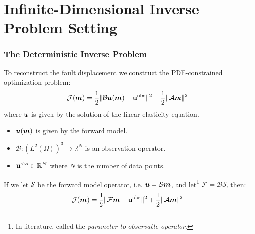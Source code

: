 \documentclass[
    pdf,
    10pt,
    xcolor={svgnames},
  ]{beamer}
\newcommand{\mc}[1]{\mathcal{#1}}
\newcommand{\R}{\mathbb{R}}
\renewcommand{\vec}[1]{{\mathchoice
                     {\mbox{\boldmath$\displaystyle{#1}$}}
                     {\mbox{\boldmath$\textstyle{#1}$}}
                     {\mbox{\boldmath$\scriptstyle{#1}$}}
                     {\mbox{\boldmath$\scriptscriptstyle{#1}$}}}}
\newcommand{\obs}{\mathbf{u}^{\rm obs}}
\begin{document}
\section{Infinite-Dimensional Inverse Problem Setting}
\begin{frame}
  \frametitle{The Deterministic Inverse Problem}
  To reconstruct the fault displacement we construct the PDE-constrained
  optimization problem:
  \[
    \mc{J}(\vec{m})
    = \frac{1}{2} \| \mc{B}\vec{u}(\vec{m}) - \obs \|^2
    + \frac{1}{2} \| \mc{A}\vec{m} \|^2
  \]
  where $\vec{u}$ is given by the solution of the linear elasticity equation.
  \begin{itemize}
    \item $\vec{u}(\vec{m})$ is given by the forward model.
    \item $\mc{B}: (L^2(\Omega))^3 \to \R^N$ is an observation operator.
    \item $\obs \in \R^N$ where $N$ is the number of data points.
  \end{itemize}
  \pause
  If we let $\mc{S}$ be the forward model operator, i.e. $\vec{u} = \mc{S}
  \vec{m}$, and let\footnote{%
    In literature, called the {\em parameter-to-observable operator}.
  } $\mc{F} = \mc{B} \mc{S}$, then:
  \[
    \mc{J}(\vec{m})
    = \frac{1}{2} \| \mc{F}\vec{m} - \obs \|^2
    + \frac{1}{2} \| \mc{A}\vec{m} \|^2
  \]
\end{frame}
\end{document}
